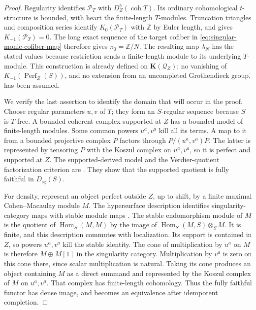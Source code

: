 \begin{proof}
Regularity identifies \(\mathcal P_T\) with
\(D^b_Z(\operatorname{coh}T)\).  Its ordinary cohomological
\(t\)-structure is bounded, with heart the finite-length \(T\)-modules.
Truncation triangles and composition series identify
\(K_0(\mathcal P_T)\) with \(\mathbb Z\) by Euler length, and
\citet[Theorem 1.1, author p.~2]{AntieauGepnerHeller2019} gives
\(K_{-1}(\mathcal P_T)=0\).  The long exact sequence of the target
cofiber in \eqref{eq:singular-monic-cofiber-map} therefore gives
\(\pi_0=\mathbb Z/N\).  The resulting map \(\lambda_N\) has the
stated values because restriction sends a finite-length module to
its underlying \(T\)-module.  This construction is already defined
on \(\mathbf K(\mathcal Q_Z)\); no vanishing of
\(K_{-1}(\operatorname{Perf}_Z(S))\), and no extension from an
uncompleted Grothendieck group, has been assumed.

We verify the last assertion to identify the domain that will occur
in the proof.  Choose regular parameters \(u,v\) of \(T\); they form
an \(S\)-regular sequence because \(S\) is \(T\)-free.  A bounded
coherent complex supported at \(Z\) has a bounded model of
finite-length modules.  Some common powers \(u^a,v^a\) kill all its
terms.  A map to it from a bounded projective complex \(P\) factors
through \(P/(u^a,v^a)P\).  The latter is represented by tensoring
\(P\) with the Koszul complex on \(u^a,v^a\), so it is perfect and
supported at \(Z\).  The supported-derived model and the
Verdier-quotient factorization criterion are
\citet[Lemmas 2.1, 2.5, and 2.6, author pp.~3--5]{Orlov2011}.
They show that the supported quotient is fully faithful in
\(D_{\mathrm{sg}}(S)\).

For density, represent an object perfect outside \(Z\), up to shift,
by a finite maximal Cohen--Macaulay module \(M\).  The hypersurface
description identifies singularity-category maps with stable module
maps \citep[equation (1.1), p.~2, and Appendix B,
pp.~37--40]{BurkeWalker2012}.  The stable endomorphism module of
\(M\) is the quotient of \(\operatorname{Hom}_S(M,M)\) by the image
of \(\operatorname{Hom}_S(M,S)\otimes_SM\).  It is finite, and this
description commutes with localization.  Its support is contained
in \(Z\), so powers \(u^a,v^a\) kill the stable identity.
The cone of multiplication by \(u^a\) on \(M\) is therefore
\(M\oplus M[1]\) in the singularity category.  Multiplication by
\(v^a\) is zero on this cone there, since scalar multiplication is
natural.  Taking its cone produces an object containing \(M\) as
a direct summand and represented by the Koszul complex of \(M\)
on \(u^a,v^a\).  That complex has finite-length cohomology.
Thus the fully faithful functor has dense image, and becomes an
equivalence after idempotent completion.
\end{proof}

